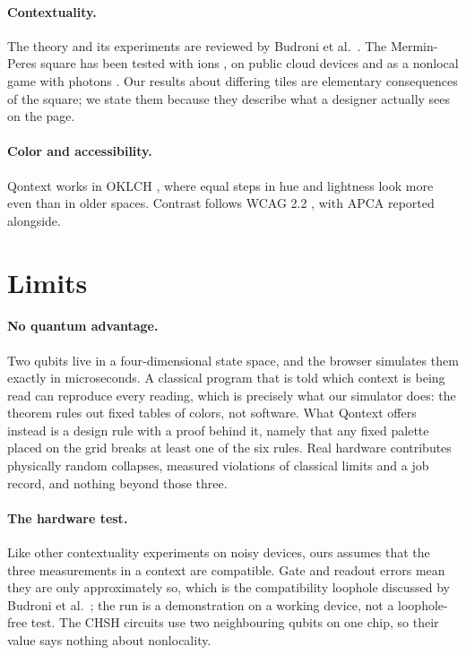 \documentclass[11pt,a4paper]{article}
\theoremstyle{qresult}
\begin{document}
\paragraph{Contextuality.} The theory and its experiments are reviewed by Budroni et al.\ \citep{budroni2022}. The
Mermin-Peres square has been tested with ions \citep{kirchmair2009}, on public cloud devices \citep{dikme2020} and as
a nonlocal game with photons \citep{xu2022}. Our results about differing tiles are elementary consequences of the
square; we state them because they describe what a designer actually sees on the page.

\paragraph{Color and accessibility.} Qontext works in OKLCH \citep{ottosson2020,csscolor4}, where equal steps in hue
and lightness look more even than in older spaces. Contrast follows WCAG 2.2 \citep{wcag22}, with APCA \citep{apca}
reported alongside.

\section{Limits}
\label{sec:limits}

\paragraph{No quantum advantage.} Two qubits live in a four-dimensional state space, and the browser simulates them
exactly in microseconds. A classical program that is told which context is being read can reproduce every reading,
which is precisely what our simulator does: the theorem rules out fixed tables of colors, not software. What Qontext
offers instead is a design rule with a proof behind it, namely that any fixed palette placed on the grid breaks at
least one of the six rules. Real hardware contributes physically random collapses, measured violations of classical
limits and a job record, and nothing beyond those three.

\paragraph{The hardware test.} Like other contextuality experiments on noisy devices, ours assumes that the three
measurements in a context are compatible. Gate and readout errors mean they are only approximately so, which is the
compatibility loophole discussed by Budroni et al.\ \citep{budroni2022}; the run is a demonstration on a working
device, not a loophole-free test. The CHSH circuits use two neighbouring qubits on one chip, so their value says
nothing about nonlocality.
\end{document}
